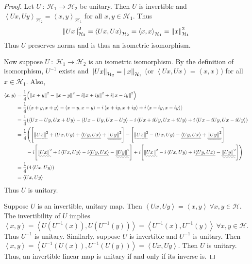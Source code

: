\documentclass{article} %
\theoremstyle{plain}
\newcommand{\VEC}[2]{\left\langle #1, #2 \right\rangle}
\numberwithin{equation}{section} %
\numberwithin{figure}{section} %
\numberwithin{table}{section} %
\begin{document}
\begin{proof}
    Let $U\ :\ \mathcal{H}_1 \rightarrow \mathcal{H}_2$ be unitary.  Then $U$ is invertible and $\VEC{Ux}{Uy}_{\mathcal{H}_2} = \VEC{x}{y}_{\mathcal{H}_1}$ for all $x, y \in \mathcal{H}_1$.  Thus
    \begin{align*}
        \norm{Ux}_{\mathcal{H}_2}^2 = \VEC{Ux}{Ux}_{\mathcal{H}_2} = \VEC{x}{x}_{\mathcal{H}_1} = \norm{x}_{\mathcal{H}_1}^2
    \end{align*}
    Thus $U$ preserves norms and is thus an isometric isomorphism.

    Now suppose $U\ :\ \mathcal{H}_1 \rightarrow \mathcal{H}_2$ is an isometric isomorphism.  By the definition of isomorphism, $U^{-1}$ exists and $\norm{Ux}_{\mathcal{H}_2} = \norm{x}_{\mathcal{H}_1}$ (or $\VEC{Ux}{Ux} = \VEC{x}{x}$) for all $x \in \mathcal{H}_1$.  Also,
    \begin{align*}
        \VEC{x}{y} &= \frac{1}{4}\qty(\norm{x + y}^2 - \norm{x - y}^2 - i \norm{x + iy}^2 + i\norm{x - iy}^2) \\
        &= \frac{1}{4}\qty(\VEC{x + y}{x + y} - \VEC{x - y}{x - y} - i \VEC{x + iy}{x + iy} + i\VEC{x - iy}{x - iy}) \\
        &= \frac{1}{4}\qty(\VEC{Ux + Uy}{Ux + Uy} - \VEC{Ux - Uy}{Ux - Uy} - i \VEC{Ux + iUy}{Ux + iUy} + i\VEC{Ux - iUy}{Ux - iUy}) \\
        &= \frac{1}{4}\Bigg(\qty[\uwave{\norm{Ux}^2} + \VEC{Ux}{Uy} + \underline{\VEC{Uy}{Ux}} + \uwave{\underline{\norm{Uy}^2}}] - \qty[\uwave{\norm{Ux}^2} - \VEC{Ux}{Uy} - \underline{\VEC{Uy}{Ux}} + \uwave{\underline{\norm{Uy}^2}}] \\
        & \qquad - i\qty[\uwave{\norm{Ux}^2} + i\VEC{Ux}{Uy} - i\underline{\VEC{Uy}{Ux}} - \uwave{\underline{\norm{Uy}^2}}] + i\qty[\uwave{\norm{Ux}^2} - i\VEC{Ux}{Uy} + i\underline{\VEC{Uy}{Ux}} - \uwave{\underline{\norm{Uy}^2}}]\Bigg) \\
        &= \frac{1}{4}\qty(4\VEC{Ux}{Uy}) \\
        &= \VEC{Ux}{Uy}
    \end{align*}
    Thus $U$ is unitary.

    Suppose $U$ is an invertible, unitary map.  Then $\VEC{Ux}{Uy} = \VEC{x}{y}\ \forall x, y \in \mathcal{H}$.  The invertibility of $U$ implies $\VEC{x}{y} = \VEC{U(U^{-1}(x))}{U(U^{-1}(y))} = \VEC{U^{-1}(x)}{U^{-1}(y)}\ \forall x, y \in \mathcal{H}$.  Thus $U^{-1}$ is unitary.  Similarly, suppose $U$ is invertible and $U^{-1}$ is unitary.  Then $\VEC{x}{y} = \VEC{U^{-1}(U(x))}{U^{-1}(U(y))} = \VEC{Ux}{Uy}$.  Then $U$ is unitary.  Thus, an invertible linear map is unitary if and only if its inverse is.
\end{proof}
\end{document}
